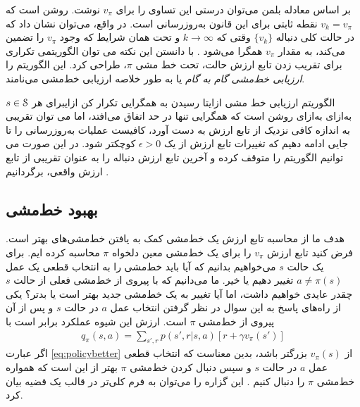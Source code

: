 بر اساس معادله بلمن می‌توان درستی این تساوی را برای 
$v_{\pi}$
نوشت. روشن است که 
 $v_k = v_{\pi}$
 نقطه ثابتی برای این قانون به‌روز‌رسانی است.
 در واقع، می‌توان نشان داد که در حالت کلی دنباله 
 $\{ v_k \}$
وقتی که 
$ k \rightarrow \infty $
و تحت همان شرایط که وجود 
$v_{\pi}$
را تضمین می‌کند، به مقدار 
$v_{\pi}$
همگرا می‌شود \cite{suttonbook}. با دانستن این نکته می توان الگوریتمی تکراری برای  تقریب زدن تابع ارزش حالت، تحت خط مشی $\pi$، طراحی کرد. این الگوریتم را 
\textit{ارزیابی خط‌مشی گام به گام}
 یا به طور خلاصه 
ارزیابی خط‌مشی
 می‌نامند.


{الگوریتم ارزیابی خط مشی}
‌ازای{تا رسیدن به همگرایی تکرار کن}
‌ازای{برای هر $s \in \EuScript{S}$}
‌به‌ازای
‌به‌ازای
روشن است که همگرایی تنها در حد اتفاق می‌افتد، اما می توان تقریبی به اندازه کافی نزدیک از تابع ارزش به دست آورد، کافیست عملیات به‌روزرسانی را تا جایی ادامه دهیم که تغییرات تابع ارزش از یک
$\epsilon > 0$
کوچکتر شود. در این صورت می توانیم الگوریتم را متوقف کرده و آخرین تابع ارزش دنباله را به عنوان تقریبی از تابع ارزش واقعی، برگردانیم \cite{suttonbook}.
% 
%
\subsection{بهبود خط‌مشی}
هدف ما از محاسبه تابع ارزش یک خط‌مشی کمک به یافتن خط‌مشی‌های بهتر است.
فرض کنید تابع ارزش 
$v_{\pi}$
 را برای یک خط‌مشی معین  دلخواه 
 $\pi$
  محاسبه کرده ایم. برای یک حالت 
  $s$
 می‌خواهیم بدانیم که آیا باید خط‌مشی را به انتخاب قطعی یک عمل 
 $a \neq \pi(s)$
  تغییر دهیم یا خیر.
ما می‌دانیم که با پیروی از خط‌مشی فعلی از حالت
 $s$
  چقدر عایدی خواهیم داشت، اما آیا تغییر به یک خط‌مشی جدید بهتر است یا بدتر؟
  یکی از راه‌های پاسخ به این سوال در نظر گرفتن انتخاب عمل  
  $a$
در حالت 
$s$
و پس از آن پیروی از خط‌مشی
$\pi$
 است. 
 ارزش این شیوه عملکرد برابر است با
 \begin{align}
q_\pi(s,a) = \sum_{s',r} p(s',r|s,a)\left[r + \gamma v_\pi(s')\right]	
 	\label{eq:policybetter}
 \end{align}
 اگر عبارت 
 \ref{eq:policybetter}
 از $v_\pi(s)$ بزرگتر باشد، بدین معناست که انتخاب قطعی عمل $a$ در حالت $s$ و سپس دنبال کردن خط‌مشی $\pi$ بهتر از این است که همواره خط‌مشی $\pi$ را دنبال کنیم \cite{suttonbook}. این گزاره را می‌توان به فرم کلی‌تر در قالب یک قضیه بیان کرد.

